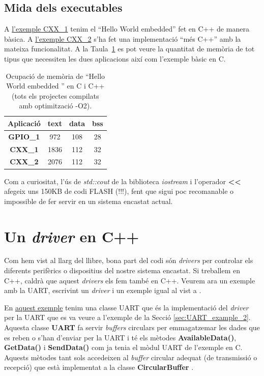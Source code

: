\subsection{Mida dels executables}
\label{CXX_size}
A \href{https://github.com/mariusmm/cursembedded/tree/master/Simplicity/CXX_1}{l'exemple CXX\_1} tenim el ``Hello World embedded'' fet en C++ de manera bàsica. A \href{https://github.com/mariusmm/cursembedded/tree/master/Simplicity/CXX_2}{l'exemple CXX\_2} s'ha fet una implementació ``més C++'' amb la mateixa funcionalitat. A la Taula~\ref{tb:CXX_size} es pot veure la quantitat de memòria de tot tipus que necessiten les dues aplicacions així com l'exemple bàsic en C.

\begin{table}[!htbp]
\caption{Ocupació de memòria de ``Hello World embedded '' en C i C++ (tots els projectes compilats amb optimització -O2).}
\centering
\begin{tabular}{|c|c|c|c|}
\hline
{\bf Aplicació} & {\bf text} & {\bf data} & {\bf bss}\\
\hline
{\bf GPIO\_1} & 972 & 108 & 28 \\
\hline
{\bf CXX\_1} & 1836 & 112 & 32 \\
\hline
{\bf CXX\_2} & 2076 & 112 & 32 \\
\hline
\end{tabular}
\label{tb:CXX_size}
\end{table}

Com a curiositat, l'ús de {\em std::cout} de la biblioteca {\em iostream} i l'operador {\bf <{}<} afegeix uns 150KB de codi FLASH (!!!), fent que sigui poc recomanable o impossible de fer servir en un sistema encastat actual.

\section{Un {\em driver} en C++}
Com hem vist al llarg del llibre, bona part del codi són {\em drivers} per controlar els diferents perifèrics o dispositius del nostre sistema encastat. Si treballem en C++, caldrà que aquest {\em drivers} els fem també en C++. Veurem ara un exemple amb la \gls{UART}, escrivint un {\em driver} i un exemple igual al vist a .

En \href{https://github.com/mariusmm/cursembedded/tree/master/Simplicity/CXX_UART}{aquest exemple} tenim una classe \gls{UART} que és la implementació del {\em driver} per la UART que es va veure a l'exemple de la Secció \ref{sec:UART_example_2}. Aquesta classe {\bf UART} fa servir {\em buffers} circulars per emmagatzemar les dades que es reben o s'han d'enviar per la UART i té els mètodes {\bf AvailableData()}, {\bf GetData()} i {\bf SendData()} com ja tenia el mòdul UART de l'exemple en C. Aquests mètodes tant sols accedeixen al {\em buffer} circular adequat (de transmissió o recepció) que està implementat a la classe {\bf CircularBuffer} .

